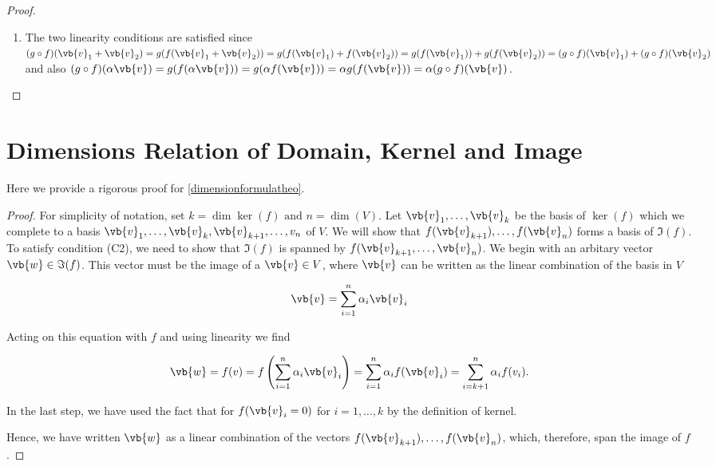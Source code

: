 \documentclass[a4paper,12pt]{report}
\begin{document}
\begin{appendices}
\begin{proof}
\begin{enumerate}[label=(F\arabic*)]
    \item The two linearity conditions are satisfied since \((g \circ f)(\vb{v} _{1} + \vb{v} _{2}  ) = g(f(\vb{v} _{1} + \vb{v} _{2}  )) = g(f(\vb{v} _{1} )+ f(\vb{v} _{2} )) = g(f(\vb{v} _{1} )) + g(f(\vb{v} _{2} )) = (g \circ f)(\vb{v} _{1} ) + (g \circ f) (\vb{v} _{2} )\) and also \((g \circ f)(\alpha \vb{v} ) = g(f(\alpha \vb{v} )) = g(\alpha f(\vb{v} )) = \alpha g(f(\vb{v} )) = \alpha (g \circ f) (\vb{v} )\).     
\end{enumerate}
\end{proof}
    
\section{Dimensions Relation of Domain, Kernel and Image} \label{dimensionformulaapp} 

Here we provide a rigorous proof for \cref{dimensionformulatheo}.

\begin{proof}
For simplicity of notation, set \(k = \dim \ker (f) \text { and } n=\dim (V)\). Let \(\vb{v}_{1}, \ldots, \vb{v}_k \) be the basis of \(\ker (f)\) which we complete to a basis \(\vb{v}_{1}, \ldots, \vb{v}_k, \vb{v} _{k+1}, \ldots ,v_{n}  \) of \(V\). We will show that \(f(\vb{v} _{k+1} ), \ldots , f(\vb{v} _{n} )\) forms a basis of \(\Im (f)\). To satisfy condition (C2), we need to show that \(\Im (f)\) is spanned by \(f(\vb{v} _{k+1}, \ldots , \vb{v} _{n}  )\). We begin with an arbitary vector \(\vb{w} \in \Im (f)\). This vector must be the image of a \(\vb{v} \in  V\), where \(\vb{v} \) can be written as the linear combination of the basis in \(V\) 
    
\begin{equation}
    \vb{v} = \sum_{i=1}^{n} \alpha _{i} \vb{v} _{i}  
\end{equation}
    
Acting on this equation with \(f\) and using linearity we find
    
\begin{equation}
    \vb{w} = f(v) = f \left( \sum_{i=1}^{n} \alpha _{i} \vb{v} _{i}  \right) = \sum_{i=1}^{n} \alpha _{i} f(\vb{v} _{i} ) = \sum_{i=k+1}^{n} \alpha _{i} f(v_{i} ).  
\end{equation}
    
In the last step, we have used the fact that for \(f(\vb{v} _{i} = 0 )\) for \(i = 1,\ldots , k\) by the definition of kernel.
    
Hence, we have written \(\vb{w}\) as a linear combination of the vectors \(f(\vb{v} _{k+1} ), \ldots , f(\vb{v} _{n} )\), which, therefore, span the image of \(f\).
    

\end{proof}
\end{appendices}
\end{document}

